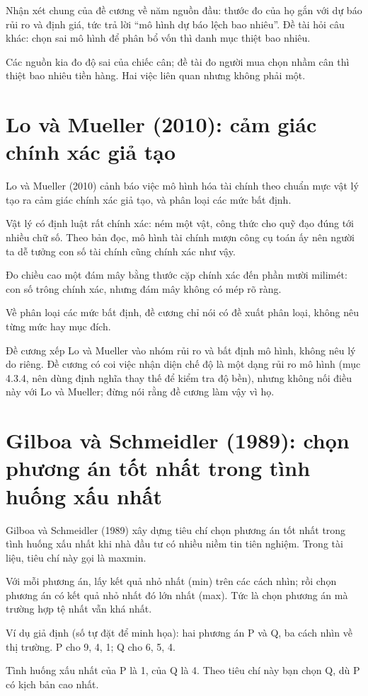 Nhận xét chung của đề cương về năm nguồn đầu: thước đo của họ gắn với dự báo rủi ro và định giá, tức trả lời “mô hình dự báo lệch bao nhiêu”. Đề tài hỏi câu khác: chọn sai mô hình để phân bổ vốn thì danh mục thiệt bao nhiêu.

Các nguồn kia đo độ sai của chiếc cân; đề tài đo người mua chọn nhầm cân thì thiệt bao nhiêu tiền hàng. Hai việc liên quan nhưng không phải một.

\section{Lo và Mueller (2010): cảm giác chính xác giả tạo}

Lo và Mueller (2010) cảnh báo việc mô hình hóa tài chính theo chuẩn mực vật lý tạo ra cảm giác chính xác giả tạo, và phân loại các mức bất định.

Vật lý có định luật rất chính xác: ném một vật, công thức cho quỹ đạo đúng tới nhiều chữ số. Theo bản đọc, mô hình tài chính mượn công cụ toán ấy nên người ta dễ tưởng con số tài chính cũng chính xác như vậy.

Đo chiều cao một đám mây bằng thước cặp chính xác đến phần mười milimét: con số trông chính xác, nhưng đám mây không có mép rõ ràng.

Về phân loại các mức bất định, đề cương chỉ nói có đề xuất phân loại, không nêu từng mức hay mục đích.

Đề cương xếp Lo và Mueller vào nhóm rủi ro và bất định mô hình, không nêu lý do riêng. Đề cương có coi việc nhận diện chế độ là một dạng rủi ro mô hình (mục 4.3.4, nên dùng định nghĩa thay thế để kiểm tra độ bền), nhưng không nối điều này với Lo và Mueller; đừng nói rằng đề cương làm vậy vì họ.

\section{Gilboa và Schmeidler (1989): chọn phương án tốt nhất trong tình huống xấu nhất}

Gilboa và Schmeidler (1989) xây dựng tiêu chí chọn phương án tốt nhất trong tình huống xấu nhất khi nhà đầu tư có nhiều niềm tin tiên nghiệm. Trong tài liệu, tiêu chí này gọi là maxmin.

Với mỗi phương án, lấy kết quả nhỏ nhất (min) trên các cách nhìn; rồi chọn phương án có kết quả nhỏ nhất đó lớn nhất (max). Tức là chọn phương án mà trường hợp tệ nhất vẫn khá nhất.

\begin{tcolorbox}[breakable]
Ví dụ giả định (số tự đặt để minh họa): hai phương án P và Q, ba cách nhìn về thị trường. P cho 9, 4, 1; Q cho 6, 5, 4.

Tình huống xấu nhất của P là 1, của Q là 4. Theo tiêu chí này bạn chọn Q, dù P có kịch bản cao nhất.
\end{tcolorbox}


